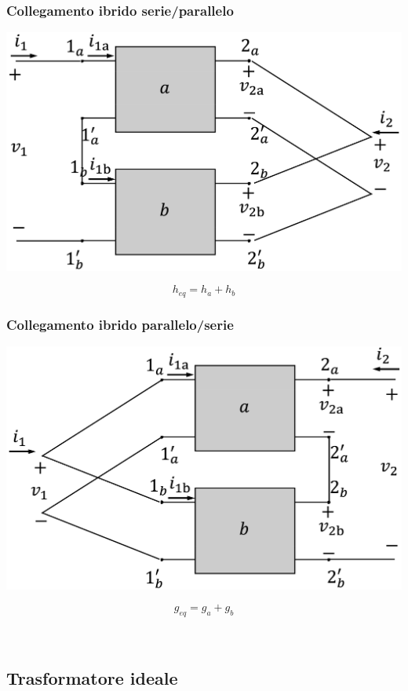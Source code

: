 \documentclass[a4paper]{article}
\begin{document}
\begin{multicols}{2}
	\columnbreak

	\subsubsection*{Collegamento ibrido serie/parallelo}
	\begin{center}
		\includegraphics[width=0.8\linewidth]{dbp_serie-parallelo.png}
	\end{center}
	\[h_{eq} = h_a + h_b\]
	
	\vspace{20pt}

	\subsubsection*{Collegamento ibrido parallelo/serie}
	\begin{center}
		\includegraphics[width=0.8\linewidth]{dbp_parallelo-serie.png}
	\end{center}
	\[g_{eq} = g_a + g_b\]
	
	\vspace{30pt}
	\(\;\) %
\end{multicols}

\newpage

\subsection{Trasformatore ideale}
\end{document}
